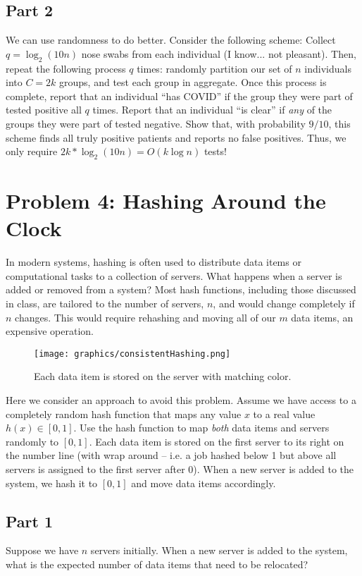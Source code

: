 \documentclass{article}
\begin{document}
\subsection*{Part 2}
We can use randomness to do better. Consider the following scheme: Collect $q = \log_2 (10n)$ nose swabs from each individual (I know... not pleasant). Then, repeat the following process $q$ times: randomly partition our set of $n$ individuals into $C=2k$ groups, and test each group in aggregate. Once this process is complete, report that an individual ``has COVID'' if the group they were part of tested positive all $q$ times. Report that an individual ``is clear'' if \emph{any} of the groups they were part of tested negative. Show that, with probability $9/10$, this scheme finds all truly positive patients and reports no false positives. Thus, we only require $2k * \log_2(10n) = O(k\log n)$ tests!

%

\section*{Problem 4: Hashing Around the Clock}

In modern systems, hashing is often used to distribute data items or computational tasks to a collection of servers. What happens when a server is added or removed from a system? Most hash functions, including those discussed in class, are tailored to the number of servers, $n$, and would change completely if $n$ changes. This would require rehashing and moving all of our $m$ data items, an expensive operation.

\begin{figure}[h]
	\centering
	\texttt{[image: graphics/consistentHashing.png]}
	\caption{Each data item is stored on the server with matching color.}
\end{figure}

Here we consider an approach to avoid this problem. Assume we have access to a completely random hash function that maps any value $x$ to a real value $h(x) \in [0,1]$. Use the hash function to map \emph{both} data items and servers randomly to $[0,1]$. Each data item is stored on the first server to its right on the number line (with wrap around -- i.e. a job hashed below 1 but above all servers is assigned to the first server after 0). When a new server is added to the system, we hash it to $[0,1]$ and move data items accordingly.

\subsection*{Part 1}
Suppose we have $n$ servers initially. When a new server is added to the system, what is the expected number of data items that need to be relocated? 
	
\end{document}
